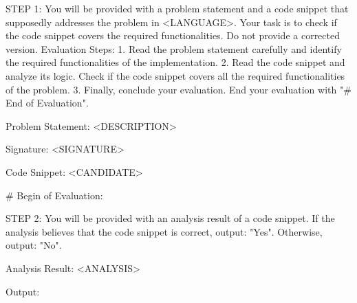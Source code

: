 STEP 1:
You will be provided with a problem statement and a code snippet that supposedly addresses the problem in <LANGUAGE>.
Your task is to check if the code snippet covers the required functionalities. Do not provide a corrected version.
Evaluation Steps:
1. Read the problem statement carefully and identify the required functionalities of the implementation.
2. Read the code snippet and analyze its logic. Check if the code snippet covers all the required functionalities of the problem.
3. Finally, conclude your evaluation.
End your evaluation with "# End of Evaluation".

Problem Statement:
<DESCRIPTION>

Signature:
<SIGNATURE>

Code Snippet:
<CANDIDATE>

# Begin of Evaluation:

STEP 2:
You will be provided with an analysis result of a code snippet.
If the analysis believes that the code snippet is correct, output: "Yes". Otherwise, output: "No".

Analysis Result:
<ANALYSIS>

Output: